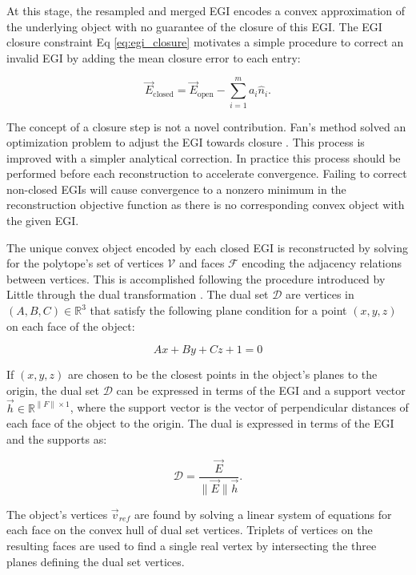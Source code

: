 At this stage, the resampled and merged EGI encodes a convex approximation of the underlying object with no guarantee of the closure of this EGI. The EGI closure constraint Eq \ref{eq:egi_closure} motivates a simple procedure to correct an invalid EGI by adding the mean closure error to each entry:

\begin{equation} \label{eq:egi_validation}
  \vec{E}_{\textrm{closed}} = \vec{E}_{\textrm{open}} - \sum_{i=1}^m a_i \hat{n}_i .
\end{equation}

The concept of a closure step is not a novel contribution. Fan's method solved an optimization problem to adjust the EGI towards closure \cite{fan2020thesis}. This process is improved with a simpler analytical correction. In practice this process should be performed before each reconstruction to accelerate convergence. Failing to correct non-closed EGIs will cause convergence to a nonzero minimum in the reconstruction objective function as there is no corresponding convex object with the given EGI.

The unique convex object encoded by each closed EGI is reconstructed by solving for the polytope's set of vertices $\mathcal{V}$ and faces $\mathcal{F}$ encoding the adjacency relations between vertices. This is accomplished following the procedure introduced by Little through the dual transformation \cite{little1983}. The dual set $\mathcal{D}$ are vertices in $(A, B, C) \in \mathbb{R}^3$ that satisfy the following plane condition for a point $(x, y, z)$ on each face of the object:

\begin{equation} \label{eq:dual_abc_form}
  Ax + By + Cz + 1 = 0
\end{equation}

If $(x, y, z)$ are chosen to be the closest points in the object's planes to the origin, the dual set $\mathcal{D}$ can be expressed in terms of the EGI and a support vector $\vec{h} \in \mathbb{R}^{\|F\| \times 1}$, where the support vector is the vector of perpendicular distances of each face of the object to the origin. The dual is expressed in terms of the EGI and the supports as:

\begin{equation} \label{eq:dual_egi_form}
  \mathcal{D} = \frac{\vec{E}}{ \| \vec{E} \| \vec{h}}.
\end{equation}

The object's vertices $\vec{v}_{ref}$ are found by solving a linear system of equations for each face on the convex hull of dual set vertices. Triplets of vertices on the resulting faces are used to find a single real vertex by intersecting the three planes defining the dual set vertices.

